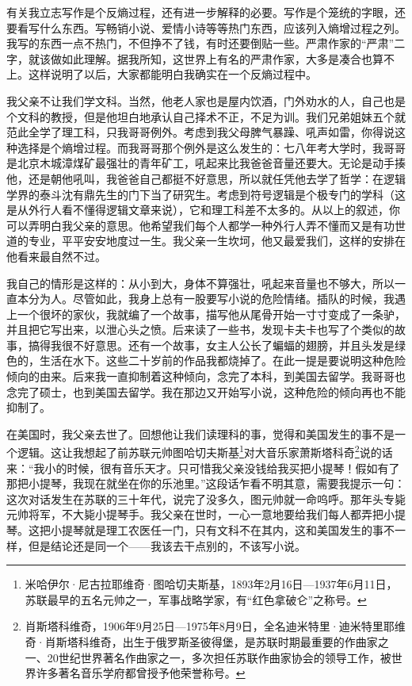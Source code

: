 \documentclass[fontset=fandol,12pt,a5paper]{ctexbook}
\begin{document}
有关我立志写作是个反熵过程，还有进一步解释的必要。写作是个笼统的字眼，还要看写什么东西。写畅销小说、爱情小诗等等热门东西，应该列入熵增过程之列。我写的东西一点不热门，不但挣不了钱，有时还要倒贴一些。严肃作家的“严肃”二字，就该做如此理解。据我所知，这世界上有名的严肃作家，大多是凑合也算不上。这样说明了以后，大家都能明白我确实在一个反熵过程中。

我父亲不让我们学文科。当然，他老人家也是屋内饮酒，门外劝水的人，自己也是个文科的教授，但是他坦白地承认自己择术不正，不足为训。我们兄弟姐妹五个就范此全学了理工科，只我哥哥例外。考虑到我父母脾气暴躁、吼声如雷，你得说这种选择是个熵增过程。而我哥哥那个例外是这么发生的：七八年考大学时，我哥哥是北京木城漳煤矿最强壮的青年矿工，吼起来比我爸爸音量还要大。无论是动手揍他，还是朝他吼叫，我爸爸自己都挺不好意思，所以就任凭他去学了哲学：在逻辑学界的泰斗沈有鼎先生的门下当了研究生。考虑到符号逻辑是个极专门的学科（这是从外行人看不懂得逻辑文章来说），它和理工科差不太多的。从以上的叙述，你可以弄明白我父亲的意思。他希望我们每个人都学一种外行人弄不懂而又是有功世道的专业，平平安安地度过一生。我父亲一生坎坷，他又最爱我们，这样的安排在他看来最自然不过。

我自己的情形是这样的：从小到大，身体不算强壮，吼起来音量也不够大，所以一直本分为人。尽管如此，我身上总有一股要写小说的危险情绪。插队的时候，我遇上一个很坏的家伙，我就编了一个故事，描写他从尾骨开始一寸寸变成了一条驴，并且把它写出来，以泄心头之愤。后来读了一些书，发现卡夫卡也写了个类似的故事，搞得我很不好意思。还有一个故事，女主人公长了蝙蝠的翅膀，并且头发是绿色的，生活在水下。这些二十岁前的作品我都烧掉了。在此一提是要说明这种危险倾向的由来。后来我一直抑制着这种倾向，念完了本科，到美国去留学。我哥哥也念完了硕士，也到美国去留学。我在那边又开始写小说，这种危险的倾向再也不能抑制了。

在美国时，我父亲去世了。回想他让我们读理科的事，觉得和美国发生的事不是一个逻辑。这让我想起了前苏联元帅图哈切夫斯基\footnote{米哈伊尔·尼古拉耶维奇·图哈切夫斯基，1893年2月16日—1937年6月11日，苏联最早的五名元帅之一，军事战略学家，有“红色拿破仑”之称号。}对大音乐家萧斯塔科奇\footnote{肖斯塔科维奇，1906年9月25日—1975年8月9日，全名迪米特里·迪米特里耶维奇·肖斯塔科维奇，出生于俄罗斯圣彼得堡，是苏联时期最重要的作曲家之一、20世纪世界著名作曲家之一，多次担任苏联作曲家协会的领导工作，被世界许多著名音乐学府都曾授予他荣誉称号。}说的话来：“我小的时候，很有音乐天才。只可惜我父亲没钱给我买把小提琴！假如有了那把小提琴，我现在就坐在你的乐池里。”这段话乍看不明其意，需要我提示一句：这次对话发生在苏联的三十年代，说完了没多久，图元帅就一命呜呼。那年头专毙元帅将军，不大毙小提琴手。我父亲在世时，一心一意地要给我们每人都弄把小提琴。这把小提琴就是理工农医任一门，只有文科不在其内，这和美国发生的事不一样，但是结论还是同一个——我该去干点别的，不该写小说。
\end{document}
